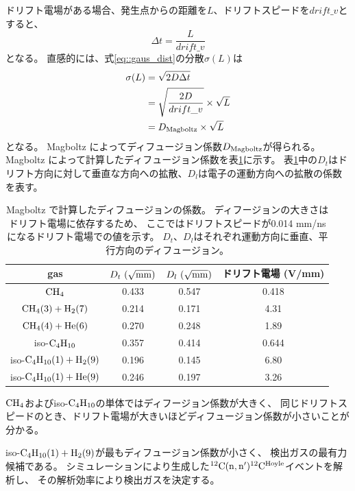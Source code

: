 \documentclass[../master]{subfiles}
\begin{document}
ドリフト電場がある場合、発生点からの距離を$L$、ドリフトスピードを$drift\_v$とすると、
\begin{equation}
  \Delta t = \frac{L}{drift\_v}
  \label{eq::delta_t}
\end{equation}
となる。
直感的には、式\ref{eq::gaus_dist}の分散$\sigma(L)$は
\begin{align}
  \sigma(L) & = \sqrt{2 D \Delta t}\\
  & = \sqrt{\frac{2 D}{drift\_v}}\times\sqrt{L}\\
  & = D_{\rm Magboltz}\times\sqrt{L}
\end{align}
となる。
Magboltz によってディフュージョン係数$D_{\rm Magboltz}$が得られる。
Magboltz によって計算したディフュージョン係数を表\ref{tab::diffusion}に示す。
表\ref{tab::diffusion}中の$D_{t}$はドリフト方向に対して垂直な方向への拡散、$D_{l}$は電子の運動方向への拡散の係数を表す。
\begin{table}
  \centering
  \caption[Magboltz で計算したディフュージョンの係数。]
          {Magboltz で計算したディフュージョンの係数。
            ディフージョンの大きさはドリフト電場に依存するため、
            ここではドリフトスピードが0.014 mm/ns になるドリフト電場での値を示す。
          $D_{t}$、$D_{l}$はそれぞれ運動方向に垂直、平行方向のディフュージョン。}
  \label{tab::diffusion}
  \begin{tabular}{cccc}
    \toprule
    gas & $D_{t}~(\sqrt{\rm mm})$ & $D_{l}~(\sqrt{\rm mm})$ & ドリフト電場 (V/mm) \\
    \midrule
    ${\rm CH_{4}}$ & 0.433 & 0.547 & 0.418\\
    ${\rm CH_{4} (3) + H_{2} (7)}$ & 0.214 & 0.171 & 4.31\\
    ${\rm CH_{4} (4) + He (6)}$ & 0.270  & 0.248 & 1.89\\
    iso-${\rm C_{4}H_{10}}$ & 0.357 & 0.414 & 0.644\\
    iso-${\rm C_{4}H_{10} (1) + H_{2}} (9)$ & 0.196 & 0.145 & 6.80\\
    iso-${\rm C_{4}H_{10} (1) + He} (9) $ & 0.246 & 0.197 & 3.26\\
    \bottomrule
  \end{tabular}
\end{table}
${\rm CH_{4}}$およびiso-${\rm C_{4}H_{10}}$の単体ではディフージョン係数が大きく、
同じドリフトスピードのとき、ドリフト電場が大きいほどディフュージョン係数が小さいことが分かる。

iso-${\rm C_{4}H_{10} (1) + H_{2}} (9)$が最もディフュージョン係数が小さく、
検出ガスの最有力候補である。
シミュレーションにより生成した${}^{12}{\rm C}({\rm n},{\rm n}'){}^{12}{\rm C}^{\rm Hoyle}$イベントを解析し、
その解析効率により検出ガスを決定する。
\end{document}
